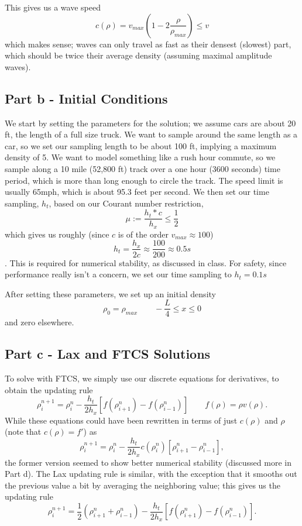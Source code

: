 \documentclass{article}
\begin{document}
This gives us a wave speed
$$c(\rho) =  v_{max}(1 - 2\frac{\rho}{\rho_{max}}) \leq v$$
which makes sense; waves can only travel as fast as their densest (slowest) part, which should be twice their average density (assuming maximal amplitude waves).

\subsection{Part b - Initial Conditions}
We start by setting the parameters for the solution; we assume cars are about 20 ft, the length of a full size truck. We want to sample around the same length as a car, so we set our sampling length to be about 100 ft, implying a maximum density of 5. We want to model something like a rush hour commute, so we sample along a 10 mile (52,800 ft) track over a one hour (3600 seconds) time period, which is more than long enough to circle the track. The speed limit is usually 65mph, which is about 95.3 feet per second. We then set our time sampling, $h_t$, based on our Courant number restriction,
$$\mu := \frac{h_t*c}{h_x} \leq \frac{1}{2}$$
which gives us roughly (since $c$ is of the order $v_{max} \approx 100$)
$$h_t = \frac{h_x}{2c} \approx \frac{100}{200} \approx 0.5 s$$.
This is required for numerical stability, as discussed in class. For safety, since performance really isn't a concern, we set our time sampling to $h_t = 0.1 s$

After setting these parameters, we set up an initial density
$$\rho_0 = \rho_{max} \qquad -\frac{L}{4} \leq x \leq 0$$
and zero elsewhere.

\subsection{Part c - Lax and FTCS Solutions}
To solve with FTCS, we simply use our discrete equations for derivatives, to obtain the updating rule
$$\rho^{n+1}_i = \rho^n_i - \frac{h_t}{2h_x}[f(\rho^n_{i+1}) - f(\rho^n_{i-1})] \qquad f(\rho) = \rho v(\rho).$$
While these equations could have been rewritten in terms of just $c(\rho)$ and $\rho$ (note that $c(\rho) = f'$) as
$$\rho^{n+1}_i = \rho^n_i - \frac{h_t}{2h_x}c(\rho^n_i)[\rho^n_{i+1} - \rho^n_{i-1}],$$
the former version seemed to show better numerical stability (discussed more in Part d).
The Lax updating rule is similar, with the exception that it smooths out the previous value a bit by averaging the neighboring value; this gives us the updating rule
$$\rho^{n+1}_i = \frac{1}{2}(\rho^n_{i+1} + \rho^n_{i-1}) - \frac{h_t}{2h_x}[f(\rho^n_{i+1}) - f(\rho^n_{i-1})].$$
\end{document}

